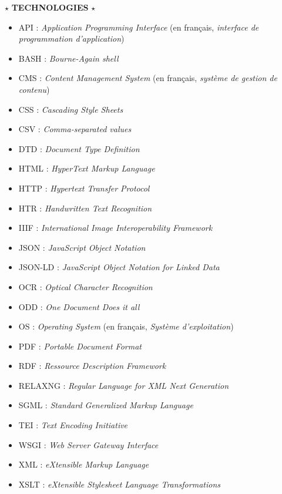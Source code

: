 \begin{center}
$\star$ \textbf{\textsc{TECHNOLOGIES}} $\star$
\end{center} 
\begin{itemize}
    \item API : \emph{Application Programming Interface} (en français, \emph{ interface de programmation d’application})
    \item BASH : \emph{Bourne-Again shell}
    \item CMS : \emph{Content Management System} (en français, \emph{système de gestion de contenu})
    \item CSS : \emph{Cascading Style Sheets}
    \item CSV : \emph{Comma-separated values}
    \item DTD : \emph{Document Type Definition}
    \item HTML : \emph{HyperText Markup Language}
    \item HTTP : \emph{Hypertext Transfer Protocol}
    \item HTR : \emph{Handwritten Text Recognition}
    \item IIIF : \emph{International Image Interoperability Framework}
    \item JSON : \emph{JavaScript Object Notation}
    \item JSON-LD : \emph{JavaScript Object Notation for Linked Data}
    \item OCR : \emph{Optical Character Recognition}
    \item ODD : \emph{One Document Does it all}
    \item OS : \emph{Operating System} (en français, \emph{Système d'exploitation})
    \item PDF : \emph{Portable Document Format}
    \item RDF : \emph{\textit{Ressource Description Framework}}
    \item RELAXNG : \emph{Regular Language for XML Next Generation}
    \item SGML : \emph{Standard Generalized Markup Language}
    \item TEI : \emph{Text Encoding Initiative}
    \item WSGI : \emph{Web Server Gateway Interface}
    \item XML : \emph{eXtensible Markup Language}
    \item XSLT : \emph{eXtensible Stylesheet Language Transformations}
\end{itemize}


